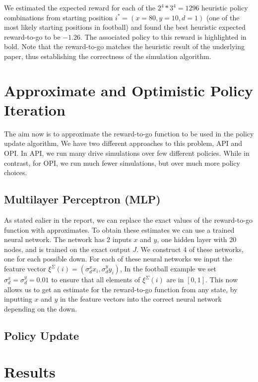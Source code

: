 \documentclass[11pt, oneside]{article}   	%
\begin{document}
We estimated the expected reward for each of the $2^4*3^4 = 1296$ heuristic policy combinations from starting position $i^* = (x=80, y=10, d=1)$ (one of the most likely starting positions in football) and found the best heuristic expected reward-to-go to be $-1.26$. The associated policy to this reward is highlighted in bold. Note that the reward-to-go matches the heuristic result of the underlying paper, thus establishing the correctness of the simulation algorithm.

\section{Approximate and Optimistic Policy Iteration}
The aim now is to approximate the reward-to-go function to be used in the policy update algorithm, We have two different approaches to this problem, API and OPI. In API, we run many drive simulations over few different policies. While in contrast, for OPI, we run much fewer simulations, but over much more policy choices.


\subsection{Multilayer Perceptron (MLP)}
As stated ealier in the report, we can replace the exact values of the reward-to-go function with approximates. To obtain these estimates we can use a trained neural network. The network has 2 inputs $x$ and $y$, one hidden layer with 20 nodes, and is trained on the exact output $J$. We construct 4 of these networks, one for each possible down. For each of these neural networks we input the feature vector $\xi^{\Sigma}(i) = (\sigma_{d}^{x} x_{i}, \sigma_{d}^{y} y_{i})$, In the football example we set $\sigma_{d}^{x} = \sigma_{d}^{y} = 0.01$ to ensure that all elements of $\xi^{\Sigma}(i)$ are in $[0,1]$. This now allows us to get an estimate for the reward-to-go function from any state, by inputting $x$ and $y$ in the feature vectors into the correct neural network depending on the down. 
\subsection{Policy Update}

\section{Results}
\end{document}
